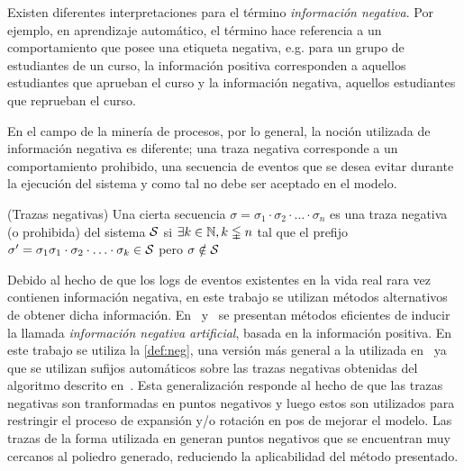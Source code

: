 Existen diferentes interpretaciones para el término \textit{información negativa}. Por ejemplo, en aprendizaje automático,
el término hace referencia a un comportamiento que posee una etiqueta negativa, e.g. para un grupo
de estudiantes de un curso, la información positiva corresponden a aquellos estudiantes que aprueban el curso
y la información negativa, aquellos estudiantes que reprueban el curso. 

En el campo de la minería de procesos, por lo general, la noción utilizada de información negativa es diferente;
una traza negativa corresponde a un comportamiento prohibido, una secuencia de eventos que se desea 
evitar durante la ejecución del sistema y como tal no debe ser aceptado en el modelo.

\begin{definition}
    \label{def:neg}
    (Trazas negativas) Una cierta secuencia $\sigma=\sigma_1\cdot\sigma_2\cdot\ldots\cdot\sigma_n$ es
    una traza negativa (o prohibida) del sistema $\mathcal{S}$ si $\exists k \in \mathbb{N}, k \lvertneqq n$ tal que
    el prefijo $\sigma'=\sigma_1\sigma_1\cdot\sigma_2\cdot\ldots\cdot\sigma_k \in \mathcal{S}$ pero $\sigma \notin \mathcal{S}$
\end{definition}

    Debido al hecho de que los logs de eventos existentes en la vida real rara vez contienen información negativa, 
en este trabajo se utilizan métodos alternativos de obtener dicha información. En~\cite{Goedertier2009} 
y~\cite{BrouckeWVB14} se presentan métodos eficientes de inducir la llamada \textit{información negativa artificial},
basada en la información positiva. 
En este trabajo se utiliza la \autoref{def:neg}, una versión más general 
a la utilizada en~\cite{Goedertier2009,BrouckeWVB14} ya que se utilizan sufijos
automáticos sobre las trazas negativas obtenidas del algoritmo 
descrito en~\cite{BrouckeWVB14}.
Esta generalización responde al hecho  de que las trazas negativas 
son tranformadas en puntos negativos y luego estos son utilizados
para restringir el proceso de expansión y/o rotación en pos de mejorar el modelo.
Las trazas de la forma utilizada en \cite{Goedertier2009,BrouckeWVB14} generan
puntos negativos que se encuentran muy cercanos al poliedro generado, reduciendo la aplicabilidad del 
método presentado.


